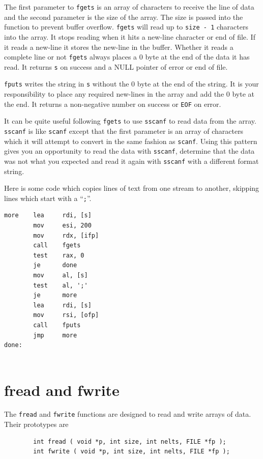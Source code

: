 \documentclass[11pt,b5paper]{book}
\begin{document}
The first parameter to {\tt fgets} is an array of characters to receive the line of data and
the second parameter is the size of the array.
The size is passed into the function to prevent buffer overflow.
{\tt fgets} will read up to {\tt size - 1} characters into the array.
It stops reading when it hits a new-line character or end of file.
If it reads a new-line it stores the new-line in the buffer.
Whether it reads a complete line or not {\tt fgets} always places a 0 byte at the end of the data it has read.
It returns {\tt s} on success and a NULL pointer of error or end of file.

{\tt fputs} writes the string in {\tt s} without the 0 byte at the end of the string.
It is your responsibility to place any required new-lines in the array and add the 0 byte at the end.
It returns a non-negative number on success or {\tt EOF} on error.

It can be quite useful following {\tt fgets} to use {\tt sscanf} to read data from the array.
{\tt sscanf} is like {\tt scanf} except that the first parameter is an array of characters which it
will attempt to convert in the same fashion as {\tt scanf}.
Using this pattern gives you an opportunity to read the data with {\tt sscanf}, determine that the
data was not what you expected and read it again with {\tt sscanf} with a different format string.

Here is some code which copies lines of text from one stream to another, skipping lines
which start with a ``{\tt ;}''.
\begin{verbatim}
more    lea     rdi, [s]
        mov     esi, 200
        mov     rdx, [ifp]
        call    fgets
        test    rax, 0
        je      done
        mov     al, [s]
        test    al, ';'
        je      more
        lea     rdi, [s]
        mov     rsi, [ofp]
        call    fputs
        jmp     more
done:
        
\end{verbatim}



\section{fread and fwrite}

The {\tt fread} and {\tt fwrite} functions are designed to read and write arrays of data.
Their prototypes are 
\begin{verbatim}
        int fread ( void *p, int size, int nelts, FILE *fp );
        int fwrite ( void *p, int size, int nelts, FILE *fp );
\end{verbatim}
\end{document}
